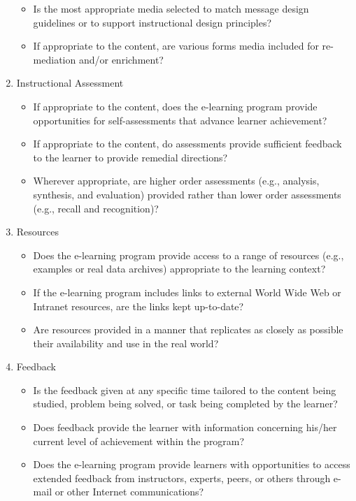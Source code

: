 \begin{enumerate}
\begin{itemize}
\item Is the most appropriate media selected to match message design guidelines or to support instructional design principles?
\item If appropriate to the content, are various forms media included for re-mediation and/or enrichment?
\end{itemize}
\item Instructional Assessment  
\begin{itemize}
\item If appropriate to the content, does the e-learning program provide opportunities for self-assessments that advance learner achievement?
\item If appropriate to the content, do assessments provide sufficient feedback to the learner to provide remedial directions?
\item Wherever appropriate, are higher order assessments (e.g., analysis, synthesis, and evaluation) provided rather than lower order assessments (e.g., recall and recognition)?
\end{itemize}
\item Resources
\begin{itemize}
\item Does the e-learning program provide access to a range of resources (e.g., examples or real data archives) appropriate to the learning context?
\item If the e-learning program includes links to external World Wide Web or Intranet resources, are the links kept up-to-date?
\item Are resources provided in a manner that replicates as closely as possible their availability and use in the real world?
\end{itemize} 
\item Feedback
\begin{itemize}
\item Is the feedback given at any specific time tailored to the content being studied, problem being solved, or task being completed by the learner?
\item Does feedback provide the learner with information concerning his/her current level of achievement within the program?
\item Does the e-learning program provide learners with opportunities to access extended feedback from instructors, experts, peers, or others through e-mail or other Internet communications?
\end{itemize}
\end{enumerate} 

